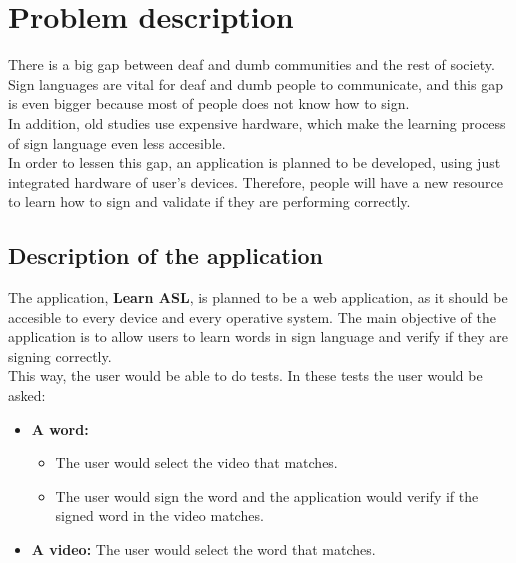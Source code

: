 \chapter{Problem description}

There is a big gap between deaf and dumb communities and the rest of society. Sign languages are vital for deaf and dumb people to communicate, and this gap is even bigger because most of people does not know how to sign. \\

In addition, old studies use expensive hardware, which make the learning process of sign language even less accesible. \\ 

In order to lessen this gap, an application is planned to be developed, using just integrated hardware of user's devices. Therefore, people will have a new resource to learn how to sign and validate if they are performing correctly.

\section{Description of the application}
The application, \textbf{Learn ASL}, is planned to be a web application, as it should be accesible to every device and every operative system.
The main objective of the application is to allow users to learn words in sign language and verify if they are signing correctly. \\

This way, the user would be able to do tests. In these tests the user would be asked:
\begin{itemize}
    \item \textbf{A word:} 
        \begin{itemize}
            \item The user would select the video that matches.
            \item The user would sign the word and the application would verify if the signed word in the video matches.
        \end{itemize}
    \item \textbf{A video:} The user would select the word that matches.
\end{itemize}


